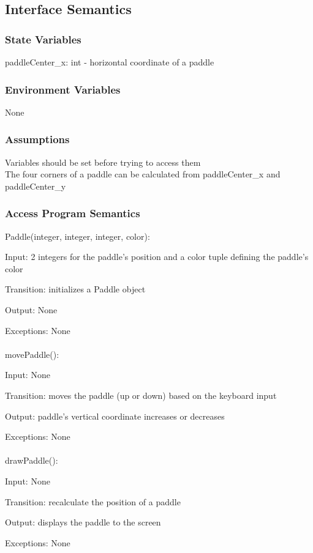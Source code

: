 \documentclass[12pt, titlepage]{article}
\begin{document}
		\subsection{Interface Semantics}
		\subsubsection{State Variables}
		paddleCenter\_x: int - horizontal coordinate of a paddle
		
		\subsubsection{Environment Variables}
		None
		\subsubsection{Assumptions}
		Variables should be set before trying to access them \\ 
		The four corners of a paddle can be calculated from paddleCenter\_x and paddleCenter\_y \\
		
		\subsubsection{Access Program Semantics}
		Paddle(integer, integer, integer, color):
		
		Input: 2 integers for the paddle's position and a color tuple defining the paddle's color
		
		Transition: initializes a Paddle object
		
		Output: None
		
		Exceptions: None\\
		\\
		movePaddle():
		
		Input: None
		
		Transition: moves the paddle (up or down) based on the keyboard input
		
		Output: paddle's vertical coordinate increases or decreases
		
		Exceptions: None\\
		\\
    	drawPaddle():
		
		Input: None
		
		Transition: recalculate the position of a paddle
		
		Output: displays the paddle to the screen
		
		Exceptions: None
		
\end{document}

